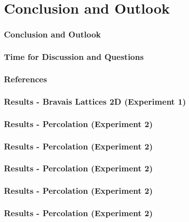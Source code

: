 \documentclass{beamer}
\begin{document}
\section{Conclusion and Outlook}
\begin{frame}
    \frametitle{Conclusion and Outlook}
    
\end{frame}

\begin{frame}
    \frametitle{Time for Discussion and Questions}
    
\end{frame}
\begin{frame}
    \frametitle{References}
    \printbibliography
\end{frame}

\begin{frame}
    \frametitle{Results - Bravais Lattices 2D (Experiment 1)}
    
\end{frame}
\begin{frame}
    \frametitle{Results - Percolation (Experiment 2)}
    
\end{frame}
\begin{frame}
    \frametitle{Results - Percolation (Experiment 2)}
    
\end{frame}
\begin{frame}
    \frametitle{Results - Percolation (Experiment 2)}
    
\end{frame}
\begin{frame}
    \frametitle{Results - Percolation (Experiment 2)}
    
\end{frame}
\begin{frame}
    \frametitle{Results - Percolation (Experiment 2)}
    
\end{frame}
\end{document}
